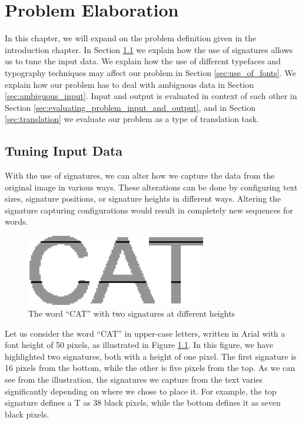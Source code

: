 
\chapter{Problem Elaboration}
\label{ch:problem}
In this chapter, we will expand on the problem definition given in the introduction chapter. In Section \ref{sec:tuning_input_data} we explain how the use of signatures allows us to tune the input data. We explain how the use of different typefaces and typography techniques may affect our problem in Section \ref{sec:use_of_fonts}. We explain how our problem has to deal with ambiguous data in Section \ref{sec:ambiguous_input}. Input and output is evaluated in context of each other in Section \ref{sec:evaluating_problem_input_and_output}, and in Section \ref{sec:translation} we evaluate our problem as a type of translation task.


\section{Tuning Input Data}
\label{sec:tuning_input_data}
With the use of signatures, we can alter how we capture the data from the original image in various ways. These alterations can be done by configuring text sizes, signature positions, or signature heights in different ways. Altering the signature capturing configurations would result in completely new sequences for words.

\begin{figure}[ht]
    \centering
    \includegraphics[width=0.7\textwidth]{fig/chapter2/signature_multiple.png}
    \caption{The word ``CAT'' with two signatures at different heights}
    \label{fig:thesis-signature-comparison}
\end{figure}

Let us consider the word ``CAT'' in upper-case letters, written in Arial with a font height of 50 pixels, as illustrated in Figure \ref{fig:thesis-signature-comparison}. In this figure, we have highlighted two signatures, both with a height of one pixel. The first signature is 16 pixels from the bottom, while the other is five pixels from the top. As we can see from the illustration, the signatures we capture from the text varies significantly depending on where we chose to place it. For example, the top signature defines a T as 38 black pixels, while the bottom defines it as seven black pixels.

